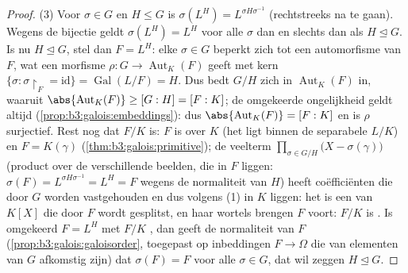 \begin{proof}
(3) Voor $\sigma \in G$ en $H \leq G$ is $\sigma(L^H) = L^{\sigma
H\sigma^{-1}}$ (rechtstreeks na te gaan). Wegens de bijectie geldt
$\sigma(L^H) = L^H$ voor alle $\sigma$ dan en slechts dan als $H
\trianglelefteq G$. Is nu $H \trianglelefteq G$, stel dan $F =
L^H$: elke $\sigma \in G$ beperkt zich tot een automorfisme van
$F$, wat een morfisme $\rho \colon G \to \operatorname{Aut}_K(F)$
geeft met kern $\{\sigma : \sigma\restriction_F = \mathrm{id}\} =
\operatorname{Gal}(L/F) = H$. Dus bedt $G/H$ zich in
$\operatorname{Aut}_K(F)$ in, waaruit
$\abs{\operatorname{Aut}_K(F)} \geq [G:H] = [F:K]$; de omgekeerde
ongelijkheid geldt altijd (\cref{prop:b3:galois:embeddings}): dus
$\abs{\operatorname{Aut}_K(F)} = [F:K]$ en is $\rho$ surjectief.
Rest nog dat $F/K$  is: $F$ is  over $K$ (het ligt
binnen de separabele $L/K$) en $F = K(\gamma)$
(\cref{thm:b3:galois:primitive}); de veelterm $\prod_{\sigma \in
G/H}\bigl(X - \sigma(\gamma)\bigr)$ (product over de verschillende
beelden, die in $F$ liggen: $\sigma(F) = L^{\sigma H\sigma^{-1}} =
L^H = F$ wegens de normaliteit van $H$) heeft coëfficiënten die
door $G$ worden vastgehouden en dus volgens (1) in $K$ liggen:
het is een  van $K[X]$ die door $F$ wordt
gesplitst, en haar wortels brengen $F$ voort: $F/K$ is . Is
omgekeerd $F = L^H$ met $F/K$ , dan geeft de normaliteit van
$F$ (\cref{prop:b3:galois:galoisorder}, toegepast op inbeddingen
$F \to \Omega$ die van elementen van $G$ afkomstig zijn) dat
$\sigma(F) = F$ voor alle $\sigma \in G$, dat wil zeggen $H
\trianglelefteq G$.
\end{proof}

